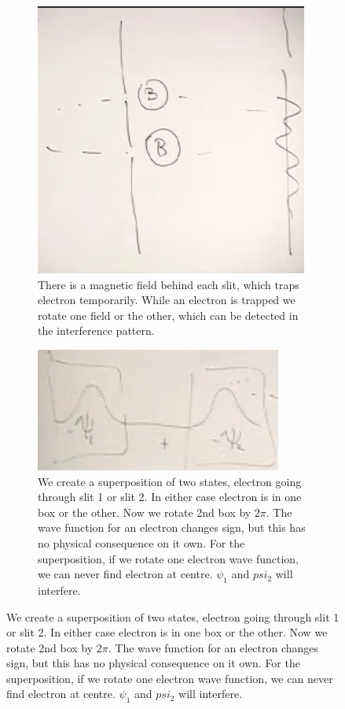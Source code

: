 \documentclass[]{article}
\begin{document}
\begin{figure}[H]
	\caption{A 2 slit experiment to detect rotation by $2\pi$}
	\begin{subfigure}[t]{0.45\textwidth}
		\begin{center}
			\caption{There is a magnetic field behind each slit, which traps electron temporarily. While an electron is trapped we rotate one field or the other, which can be detected in the interference pattern.}\label{fig:particles3-2-2slit}
			\includegraphics[width=\textwidth]{particles3-2-2slit}
		\end{center}
	\end{subfigure}
	\begin{subfigure}[t]{0.45\textwidth}
	\begin{center}
		\caption{We create a superposition of two states, electron going through slit 1 or slit 2. In either case electron is in one box or the other. Now we rotate 2nd box by $2\pi$. The wave function for an electron changes sign, but this has no physical consequence on it own. For the superposition, if we rotate one electron wave function, we can never find electron at centre. $\psi_1$ and $psi_2$ will interfere.}\label{fig:particles3-2-2slit-wave-function-2-2slit}
		\includegraphics[width=\textwidth]{particles3-2-2slit-wave-function}
	\end{center}
\end{subfigure}
\end{figure}
\end{document}
